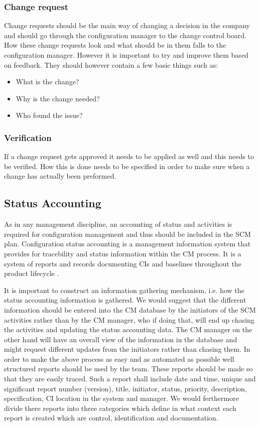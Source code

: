 \documentclass[a4paper]{article}
\begin{document}
\subsubsection{Change request}
Change requests should be the main way of changing a decision in the company and should go through the configuration manager to the change control board. How these change requests look and what should be in them falls to the configuration manager. However it is important to try and improve them based on feedback. They should however contain a few basic things such as:
\begin{itemize}
\item What is the change?
\item Why is the change needed?
\item Who found the issue?
\end{itemize}

\subsubsection{Verification}
If a change request gets approved it needs to be applied as well and this needs to be verified. How this is done needs to be specified in order to make sure when a change has actually been preformed.

\subsection{Status Accounting}

As in any management discipline, an accounting of status and activities is required for configuration management \cite{daniels} and thus should be included in the SCM plan. Configuration status accounting is a management information system that provides for tracebility and status information within the CM process. It is a system of reports and records documenting CIs and baselines throughout the product lifecycle \cite{daniels}. 

It is important to construct an information gathering mechanism, i.e. how the status accounting information is gathered. We would suggest that the different information should be entered into the CM database by the initiators of the SCM activities rather than by the CM manager, who if doing that, will end up chasing the activities and updating the status accounting data. The CM manager on the other hand will have an overall view of the information in the database and might request different updates from the initiators rather than chasing them. In order to make the above process as easy and as automated as possible well structured reports should be used by the team. These reports should be made so that they are easily traced. Such a report shall include date and time, unique and significant report number (version), title, initiator, status, priority, description, specification, CI location in the system and manager. We would ferthermore divide there reports into three categories which define in what context each report is created which are control, identification and documentation.
\end{document}
